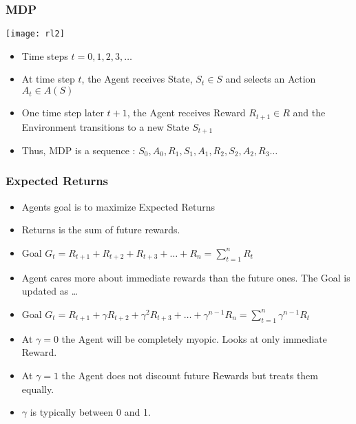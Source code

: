 \begin{frame}[fragile]\frametitle{MDP}

\begin{center}
\texttt{[image: rl2]}
\end{center}

\begin{itemize}
\item Time steps $t = 0,1,2,3,\ldots$
\item At time step $t$, the Agent receives State, $S_t \in S$ and selects an Action $A_t \in A(S)$
\item One time step later $t+1$, the Agent receives Reward $R_{t+1} \in R$ and the Environment transitions to a new State $S_{t+1}$
\item Thus, MDP is a sequence : $S_0,A_0,R_1,S_1,A_1,R_2,S_2,A_2,R_3\ldots$
\end{itemize}

\end{frame}

\begin{frame}[fragile]\frametitle{Expected Returns}

\begin{itemize}
\item Agents goal is to maximize Expected Returns
\item Returns is the sum of future rewards.
\item Goal $G_t= R_{t+1} + R_{t+2} + R_{t+3} + \ldots + R_n = \sum_{t=1}^{n}R_t$
\item Agent cares more about immediate rewards than the future ones. The Goal is updated as \ldots
\item Goal $G_t= R_{t+1} + \gamma R_{t+2} + \gamma^2 R_{t+3} + \ldots + \gamma^{n-1}R_n = \sum_{t=1}^{n}\gamma^{n-1}R_t$
\item At $\gamma = 0$ the Agent will be completely myopic. Looks at only immediate Reward.
\item At $\gamma = 1$ the Agent does not discount future Rewards but treats them equally.
\item $\gamma$ is typically between 0 and 1.

\end{itemize}

\end{frame}

